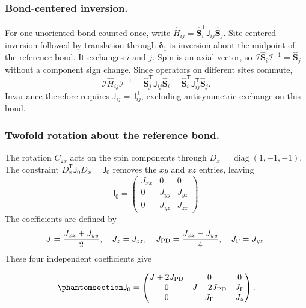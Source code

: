 \subsubsection*{Bond-centered inversion.}
For one unoriented bond counted once, write
\(\hat H_{ij}=\hat{\mathbf S}_i^{\mathsf T}\mathsf J_{ij}\hat{\mathbf S}_j\).
Site-centered inversion followed by translation through
\(\boldsymbol\delta_1\) is inversion about the midpoint of the reference
bond. It exchanges \(i\) and \(j\). Spin is an axial vector, so
\(\mathcal I\hat{\mathbf S}_i\mathcal I^{-1}=\hat{\mathbf S}_j\)
without a component sign change. Since operators on different sites commute,
\begin{equation*}
\mathcal I\hat H_{ij}\mathcal I^{-1}
=\hat{\mathbf S}_j^{\mathsf T}\mathsf J_{ij}\hat{\mathbf S}_i
=\hat{\mathbf S}_i^{\mathsf T}\mathsf J_{ij}^{\mathsf T}\hat{\mathbf S}_j.
\end{equation*}
Invariance therefore requires \(\mathsf J_{ij}=\mathsf J_{ij}^{\mathsf T}\),
excluding antisymmetric exchange on this bond.

\subsubsection*{Twofold rotation about the reference bond.}
The rotation \(C_{2x}\) acts on the spin components through
\(D_x=\operatorname{diag}(1,-1,-1)\). The constraint
\(D_x^{\mathsf T}\mathsf J_0D_x=\mathsf J_0\) removes the \(xy\) and
\(xz\) entries, leaving
\begin{equation*}
\mathsf J_0=\begin{pmatrix}
J_{xx}&0&0\\0&J_{yy}&J_{yz}\\0&J_{yz}&J_{zz}
\end{pmatrix}.
\end{equation*}
The coefficients are defined by
\begin{equation*}
J=\frac{J_{xx}+J_{yy}}2,\quad J_z=J_{zz},\quad
J_{\rm PD}=\frac{J_{xx}-J_{yy}}4,\quad J_\Gamma=J_{yz}.
\end{equation*}
\newpage
These four independent coefficients give

\begin{equation}\phantomsection\label{eq-nbcp-reference-bond}{
\mathsf J_0=
\begin{pmatrix}
J+2J_{\rm PD}&0&0\\
0&J-2J_{\rm PD}&J_\Gamma\\
0&J_\Gamma&J_z
\end{pmatrix}.
}\end{equation}

